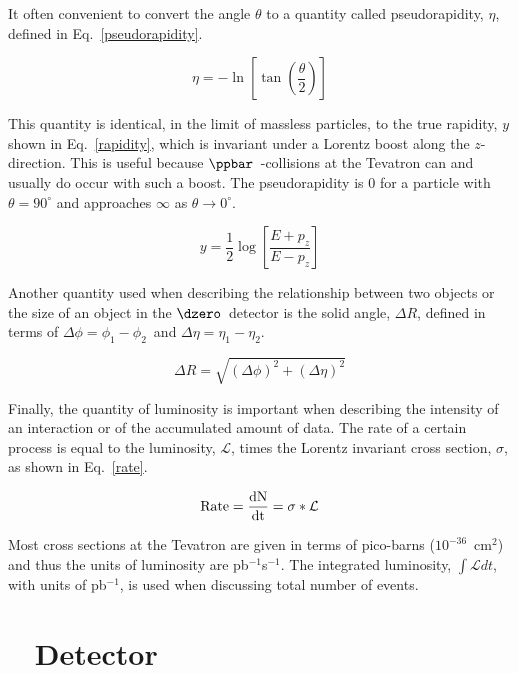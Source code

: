 It often convenient to convert the angle $\theta$ to a quantity called pseudorapidity, $\eta$, defined in Eq.~\ref{pseudorapidity}.

\begin{equation}
\label{pseudorapidity}
\eta = -\ln \left[ \tan \left( \frac{\theta}{2} \right) \right]
\end{equation}

This quantity is identical, in the limit of massless particles, to the true rapidity, $y$ shown in Eq.~\ref{rapidity}, which is invariant under a Lorentz boost along the $z$-direction. This is useful because $\ppbar$~-collisions at the Tevatron can and usually do occur with such a boost. The pseudorapidity is $0$ for a particle with $\theta = 90^{\circ}$ and approaches $\infty$ as $\theta \rightarrow 0^{\circ}$.

\begin{equation}
\label{rapidity}
y = \frac{1}{2}\log \left[ \frac{E + p_{z}}{E - p_{z}} \right]
\end{equation}

Another quantity used when describing the relationship between two objects or the size of an object in the $\dzero$~detector is the solid angle, $\Delta R$, defined in terms of $\Delta\phi=\phi_{1} - \phi_{2}$~and $\Delta\eta=\eta_{1} - \eta_{2}$.

\begin{equation}
\Delta R = \sqrt{(\Delta\phi)^{2} + (\Delta\eta)^{2}}
\end{equation}

Finally, the quantity of luminosity is important when describing the intensity of an interaction or of the accumulated amount of data. The rate of a certain process is equal to the luminosity, $\mathcal{L}$, times the Lorentz invariant cross section, $\sigma$, as shown in Eq.~\ref{rate}.

\begin{equation}
\label{rate}
\rm{Rate} = \frac{dN}{dt} = \sigma * \mathcal{L}
\end{equation}

Most cross sections at the Tevatron are given in terms of pico-barns ($10^{-36}$~cm$^{2}$) and thus the units of luminosity are pb$^{-1}$s$^{-1}$. The integrated luminosity, $\int \mathcal{L} dt$, with units of pb$^{-1}$, is used when discussing total number of events.


\section{\dzero~ Detector}
\label{detector}


